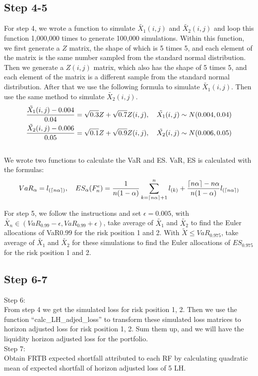\documentclass{article}
\begin{document}
\subsection*{Step 4-5}
For step 4, we wrote a function to simulate $\tilde {X_1}(i,j)$ and $\tilde {X_2}(i,j)$ and loop this function 1,000,000 times to generate 100,000 simulations. 
Within this function, we first generate a $Z$ matrix, the shape of which is 5 times 5, and each element of the matrix is the same number sampled from the standard normal distribution. Then we generate a $Z(i,j)$ matrix, which also has the shape of 5 times 5, and each element of the matrix is a different sample from the standard normal distribution. After that we use the following formula to simulate $\tilde {X_1}(i,j)$. Then use the same method to simulate $\tilde {X_2}(i,j)$.
\begin{equation}
  \begin{aligned}
\frac {\tilde {X_1}(i,j)-0.004} {0.04} = \sqrt{0.3}Z+\sqrt{0.7}Z(i,j) , \quad\tilde {X_1}(i,j) \sim N (0.004,0.04)\\
\frac {\tilde {X_2}(i,j)-0.006} {0.05} = \sqrt{0.1}Z+\sqrt{0.9}Z(i,j) , \quad\tilde {X_2}(i,j) \sim N (0.006,0.05)\\
\notag
  \end{aligned}
\end{equation}
We wrote two functions to calculate the VaR and ES.
VaR, ES is calculated with the formulas:
$$
VaR_\alpha = l_{(\lceil n\alpha \rceil)}, \quad
ES_{\alpha}(F_n^e) = \frac {1} {n(1-\alpha)} \sum ^n_{k=\lceil n\alpha \rceil + 1} l_{(k)} + \frac {\lceil n\alpha \rceil - n\alpha} {n(1-\alpha)} l_{(\lceil n\alpha \rceil)}
\notag
$$

\noindent For step 5, we follow the instructions and set $\epsilon = 0.005$, with $\tilde {X_n} \in (VaR_{0.99} - \epsilon, VaR_{0.99} + \epsilon)$, take average of $\tilde {X_1}$ and $\tilde {X_2}$ to find the Euler allocations of
VaR0.99 for the risk position 1 and 2.
With $\tilde {X} \leq VaR_{0.975}$,  take average of $\tilde {X_1}$ and $\tilde {X_2}$ for these simulations to find the Euler allocations of $ES_{0.975}$ for the risk position 1 and 2.
\subsection*{Step 6-7}
Step 6:\\
From step 4 we get the simulated loss for risk position 1, 2. Then we use the function “calc\_LH\_adjed\_loss” to transform these simulated loss matrices to horizon adjusted loss for risk position 1, 2. Sum them up, and we will have the liquidity horizon adjusted loss for the portfolio.
\\Step 7:\\
Obtain FRTB expected shortfall attributed to each RF by calculating quadratic mean of expected shortfall of horizon adjusted loss of 5 LH.
\end{document}
